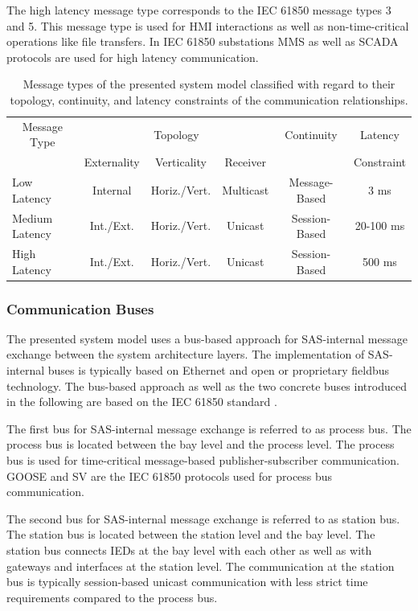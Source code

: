 The high latency message type corresponds to the IEC 61850 message types 3 and 5.
This message type is used for HMI interactions as well as non-time-critical operations like file transfers.
In IEC 61850 substations MMS as well as SCADA protocols are used for high latency communication.
\begin{table}
    \centering
    \caption{Message types of the presented system model classified with regard to their topology, continuity, and latency constraints of the communication relationships.}
    \label{tab:message_types}
    \begin{tabular}{l c c c c c}
    \toprule
    \multicolumn{1}{c}{Message Type} & \multicolumn{3}{c}{Topology} & Continuity & Latency\\
    & Externality & Verticality & Receiver & & Constraint\\
    \midrule
    Low Latency & Internal & Horiz./Vert. & Multicast & Message-Based & 3 ms\\
    Medium Latency & Int./Ext. & Horiz./Vert. & Unicast & Session-Based & 20-100 ms\\
    High Latency & Int./Ext. & Horiz./Vert. & Unicast & Session-Based & 500 ms\\
    \bottomrule
    \end{tabular}
\end{table}

\subsubsection{Communication Buses}
The presented system model uses a bus-based approach for SAS-internal message exchange between the system architecture layers.
The implementation of SAS-internal buses is typically based on Ethernet and open or proprietary fieldbus technology.
The bus-based approach as well as the two concrete buses introduced in the following are based on the IEC 61850 standard \cite{IEC61850P5}.

The first bus for SAS-internal message exchange is referred to as process bus.
The process bus is located between the bay level and the process level.
The process bus is used for time-critical message-based publisher-subscriber communication.
GOOSE and SV are the IEC 61850 protocols used for process bus communication.

The second bus for SAS-internal message exchange is referred to as station bus.
The station bus is located between the station level and the bay level.
The station bus connects IEDs at the bay level with each other as well as with gateways and interfaces at the station level.
The communication at the station bus is typically session-based unicast communication with less strict time requirements compared to the process bus.

